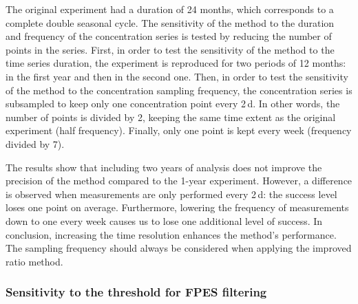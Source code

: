         The original experiment had a duration of 24 months, which corresponds to a complete double seasonal cycle.
        The sensitivity of the method to the duration and frequency of the concentration series is tested by reducing the number of points in the series.
        First, in order to test the sensitivity of the method to the time series duration, the experiment is reproduced for two periods of 12 months: in the first year and then in the second one.
        Then, in order to test the sensitivity of the method to the concentration sampling frequency, the concentration series is subsampled to keep only one concentration point every 2\,d. In other words, the number of points is divided by 2, keeping the same time extent as the original experiment (half frequency).
        Finally, only one point is kept every week (frequency divided by 7).

        The results show that including two years of analysis does not improve the precision of the method compared to the 1-year experiment.
        However, a difference is observed when measurements are only performed every 2\,d: the success level loses one point on average.
        Furthermore, lowering the frequency of measurements down to one every week causes us to lose one additional level of success.
        In conclusion, increasing the time resolution enhances the method's performance. The sampling frequency should always be considered when applying the improved ratio method.


    \subsubsection{Sensitivity to the threshold for FPES filtering}
        \label{P1sec:sensi_threshold}

